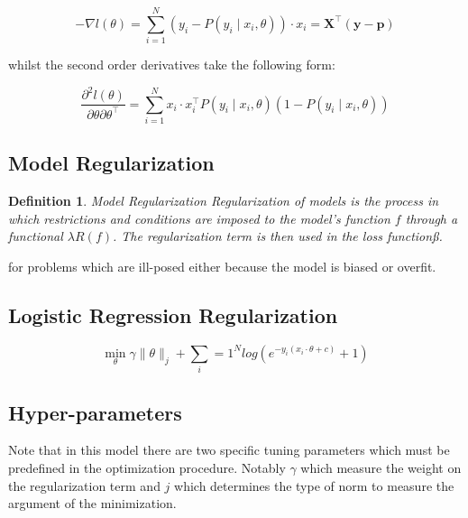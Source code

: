 \documentclass{article}%
\newtheorem{definition}{Definition}[subsection]
\theoremstyle{definition}
\begin{document}
\[
- \nabla  l(\theta) = \sum_{i=1}^N (y_i - P(y_i \mid x_i,\theta))\cdot x_i = \textbf{X}^{\intercal}(\textbf{y}-\textbf{p})
\]

whilst the second order derivatives take the following form:

\[
\frac{\partial^2 l(\theta)}{\partial \theta \partial \theta^\intercal} = \sum_{i=1}^N x_i \cdot x_i^\intercal P(y_i \mid x_i,\theta)(1 -P(y_i \mid x_i,\theta))
\]

\subsection{Model Regularization}

\begin{definition}{Model Regularization}
Regularization of models is the process in which restrictions and conditions are imposed  to the model's function $f$ through a functional $\lambda R(f)$. The regularization term is then used in the loss functionß.
\end{definition}

for problems which are ill-posed either because the model is biased or overfit.



  \subsection{Logistic Regression Regularization}

\begin{equation} \label{logit-optimization}
\min_{\theta} \gamma\| \theta\|_{j}  + \sum_i=1^N log(e^{-y_i (x_i \cdot \theta + c )} +1) 
\end{equation}



\subsection{Hyper-parameters}

Note that in this model there are two specific tuning parameters which must be predefined in the optimization procedure. Notably $\gamma$ which measure the weight on the regularization term and $j$ which determines the type of norm to measure the argument of the minimization.




\textit{}

\textit{}

\textit{}

\textit{}

\textit{} 
\end{document}
